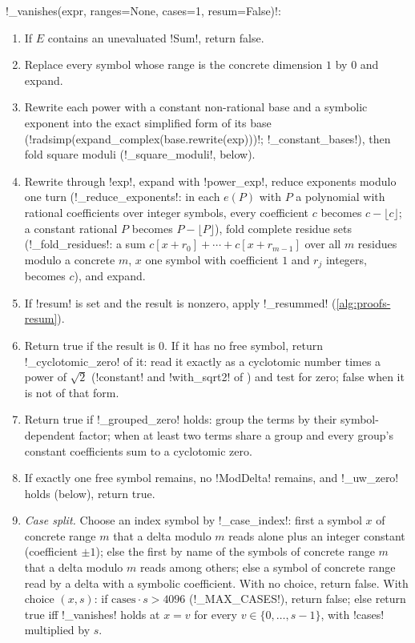 \begin{algorithm}\label{alg:proofs-vanishes}
\py!_vanishes(expr, ranges=None, cases=1, resum=False)!:
\begin{enumerate}
\item If $E$ contains an unevaluated \py!Sum!, return false.
\item Replace every symbol whose range is the concrete dimension $1$ by $0$ and expand.
\item Rewrite each power with a constant non-rational base and a symbolic exponent into the exact simplified form of its base (\py!radsimp(expand_complex(base.rewrite(exp)))!; \py!_constant_bases!), then fold square moduli (\py!_square_moduli!, below).
\item Rewrite through \py!exp!, expand with \py!power_exp!, reduce exponents modulo one turn (\py!_reduce_exponents!: in each $e(P)$ with $P$ a polynomial with rational coefficients over integer symbols, every coefficient $c$ becomes $c-\lfloor c\rfloor$; a constant rational $P$ becomes $P-\lfloor P\rfloor$), fold complete residue sets (\py!_fold_residues!: a sum $c[x+r_0]+\cdots+c[x+r_{m-1}]$ over all $m$ residues modulo a concrete $m$, $x$ one symbol with coefficient $1$ and $r_j$ integers, becomes $c$), and expand.
\item If \py!resum! is set and the result is nonzero, apply \py!_resummed! (\cref{alg:proofs-resum}).
\item Return true if the result is $0$. If it has no free symbol, return \py!_cyclotomic_zero! of it: read it exactly as a cyclotomic number times a power of $\sqrt2$ (\py!constant! and \py!with_sqrt2! of ) and test for zero; false when it is not of that form.
\item Return true if \py!_grouped_zero! holds: group the terms by their symbol-dependent factor; when at least two terms share a group and every group's constant coefficients sum to a cyclotomic zero.
\item If exactly one free symbol remains, no \py!ModDelta! remains, and \py!_uw_zero! holds (below), return true.
\item \emph{Case split.} Choose an index symbol by \py!_case_index!: first a symbol $x$ of concrete range $m$ that a delta modulo $m$ reads alone plus an integer constant (coefficient $\pm1$); else the first by name of the symbols of concrete range $m$ that a delta modulo $m$ reads among others; else a symbol of concrete range read by a delta with a symbolic coefficient. With no choice, return false. With choice $(x,s)$: if $\text{cases}\cdot s>4096$ (\py!_MAX_CASES!), return false; else return true iff \py!_vanishes! holds at $x=v$ for every $v\in\{0,\ldots,s-1\}$, with \py!cases! multiplied by $s$.
\end{enumerate}
\end{algorithm}

